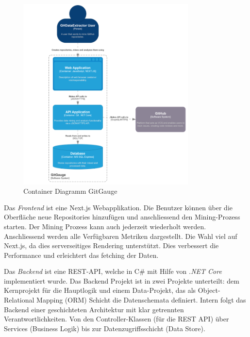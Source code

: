 \begin{figure}[htbp]
    \centering
    \includegraphics[width=0.8\textwidth]{Figures/container-diagram-gitgauge.png}
    \caption{Container Diagramm GitGauge \parencite{grand_joel_vt1_joelgrand_repository_2024}}
    \label{fig:container-diagram-gitgauge}
\end{figure}

Das \textit{Frontend} ist eine Next.js Webapplikation. Die Benutzer können über die Oberfläche neue Repositories hinzufügen und anschliessend den Mining-Prozess starten. Der Mining Prozess kann auch jederzeit wiederholt werden. Anschliessend werden alle Verfügbaren Metriken dargestellt. Die Wahl viel auf Next.js, da dies serverseitiges Rendering unterstützt. Dies verbessert die Performance und erleichtert das fetching der Daten. \parencite{grand_joel_vt1_joelgrand_repository_2024}

Das \textit{Backend} ist eine REST-API, welche in C\# mit Hilfe von \textit{.NET Core} implementiert wurde. Das Backend Projekt ist in zwei Projekte unterteilt: dem Kernprojekt für die Hauptlogik und einem Data-Projekt, das als Object-Relational Mapping (ORM) Schicht die Datenschemata definiert. Intern folgt das Backend einer geschichteten Architektur mit klar getrennten Verantwortlichkeiten. Von den Controller-Klassen (für die REST API) über Services (Business Logik) bis zur Datenzugriffsschicht (Data Store). \parencite{grand_joel_vt1_joelgrand_repository_2024}

